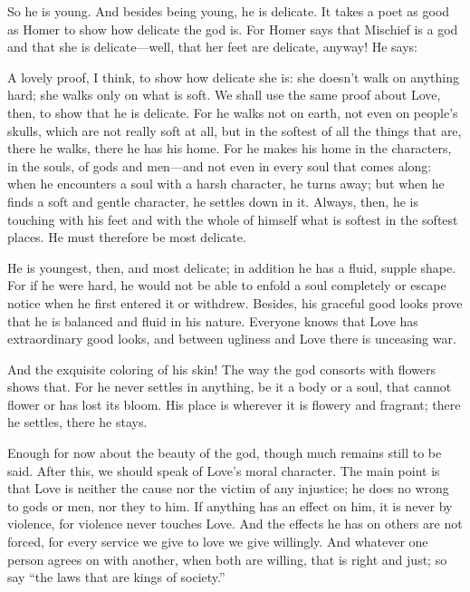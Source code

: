  So he is young. And besides being young, he is delicate. It
takes a poet as good as Homer to show how delicate the god is. For Homer
says that Mischief is a god and that she is delicate---well, that her
feet are delicate, anyway! He says:

\blank[line]
\par
{}
\blank[line]

 A lovely proof, I think, to show how delicate she is: she
doesn’t walk on anything hard; she walks only on what is soft. We shall
use the same proof about Love, then, to show that he is delicate. For he
walks not on earth, not even on people’s skulls, which are not really
soft at all, but in the softest of all the things that are, there he
walks, there he has his home. For he makes his home in the characters,
in the souls, of gods and men---and not even in every soul that comes
along: when he encounters a soul with a harsh character, he turns away;
but when he finds a soft and gentle character, he settles down in it.
Always, then, he is touching with his feet  and with the
whole of himself what is softest in the softest places. He must
therefore be most delicate.

He is youngest, then, and most delicate; in addition he has a fluid,
supple shape. For if he were hard, he would not be able to enfold a soul
completely or escape notice when he first entered it or withdrew.
Besides, his graceful good looks prove that he is balanced and fluid in
his nature. Everyone knows that Love has extraordinary good looks, and
between ugliness and Love there is unceasing war.

And the exquisite coloring of his skin! The way the god consorts with
 flowers shows that. For he never settles in anything, be it a
body or a soul, that cannot flower or has lost its bloom. His place is
wherever it is flowery and fragrant; there he settles, there he stays.

Enough for now about the beauty of the god, though much remains still to
be said. After this, we should speak of Love’s moral
character. The main
point is that Love is neither the cause nor the victim of any injustice;
he does no wrong to gods or men, nor they to him. If anything has an
effect on him, it is never by violence, for violence never touches Love.
 And the effects he has on others are not forced, for every
service we give to love we give willingly. And whatever one person
agrees on with another, when both are willing, that is right and just;
so say “the laws that are kings of
society.”

